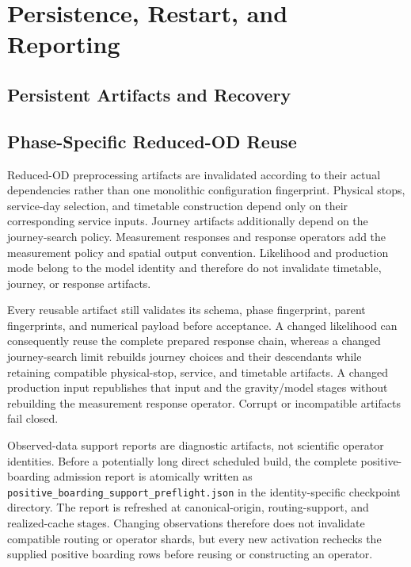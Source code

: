 
\section{Persistence, Restart, and Reporting}
\subsection{Persistent Artifacts and Recovery}




\subsection{Phase-Specific Reduced-OD Reuse}

Reduced-OD preprocessing artifacts are invalidated according to their actual
dependencies rather than one monolithic configuration fingerprint. Physical
stops, service-day selection, and timetable construction depend only on their
corresponding service inputs. Journey artifacts additionally depend on the
journey-search policy. Measurement responses and response operators add the
measurement policy and spatial output convention. Likelihood and production
mode belong to the model identity and therefore do not invalidate timetable,
journey, or response artifacts.

Every reusable artifact still validates its schema, phase fingerprint, parent
fingerprints, and numerical payload before acceptance. A changed likelihood
can consequently reuse the complete prepared response chain, whereas a changed
journey-search limit rebuilds journey choices and their descendants while
retaining compatible physical-stop, service, and timetable artifacts. A
changed production input republishes that input and the gravity/model stages
without rebuilding the measurement response operator. Corrupt or incompatible
artifacts fail closed.

Observed-data support reports are diagnostic artifacts, not scientific
operator identities.  Before a potentially long direct scheduled build, the
complete positive-boarding admission report is atomically written as
\texttt{positive\_boarding\_support\_preflight.json} in the identity-specific
checkpoint directory.  The report is refreshed at canonical-origin,
routing-support, and realized-cache stages.  Changing observations therefore
does not invalidate compatible routing or operator shards, but every new
activation rechecks the supplied positive boarding rows before reusing or
constructing an operator.

